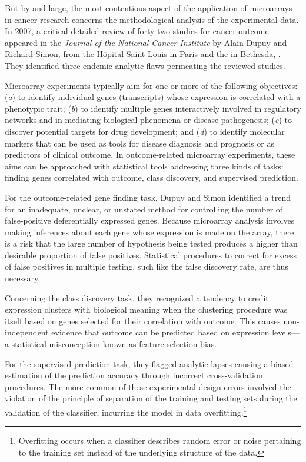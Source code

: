 But by and large, the most contentious aspect of the application of microarrays
in cancer research concerns the methodological analysis of the experimental
data.  In 2007, a critical detailed review of \mbox{forty-two} studies for
cancer outcome appeared in the \emph{Journal of the National Cancer Institute}
by Alain Dupuy and Richard Simon, from the Hôpital Saint-Louis in Paris and the
 in Bethesda, .\cite{dupuy_critical_2007} They
identified three endemic analytic flaws permeating the reviewed studies.

Microarray experiments typically aim for one or more of the following
objectives: (\emph{a}) to identify individual genes (transcripts) whose
expression is correlated with a phenotypic trait; (\emph{b}) to identify
multiple genes interactively involved in regulatory networks and in mediating
biological phenomena or disease pathogenesis; (\emph{c}) to discover potential
targets for drug development; and (\emph{d}) to identify molecular markers that
can be used as tools for disease diagnosis and prognosis or as predictors of
clinical outcome.\cite{kim_expectations_2010} In \mbox{outcome-related}
microarray experiments, these aims can be approached with statistical tools
addressing three kinds of tasks: finding genes correlated with outcome, class
discovery, and supervised prediction.

For the outcome-related gene finding task, Dupuy and Simon identified a trend
for an inadequate, unclear, or unstated method for controlling the number of
\mbox{false-positive} deferentially expressed genes.  Because microarray
analysis involves making inferences about each gene whose expression is made on
the array, there is a risk that the large number of hypothesis being tested
produces a higher than desirable proportion of false positives.  Statistical
procedures to correct for excess of false positives in multiple testing, such
like the false discovery rate, are thus
necessary.\cite{benjamini_controlling_1995,noble_how_2009}

Concerning the class discovery task, they recognized a tendency to credit
expression clusters with biological meaning when the clustering procedure was
itself based on genes selected for their correlation with outcome.  This causes
non-independent evidence that outcome can be predicted based on expression
levels---a statistical misconception known as feature selection
bias.\cite{ambroise_selection_2002}

For the supervised prediction task, they flagged analytic lapses causing a
biased estimation of the prediction accuracy through incorrect cross-validation
procedures.  The more common of these experimental design errors involved the
violation of the principle of separation of the training and testing sets during
the validation of the classifier, incurring the model in data
overfitting.\footnote{Overfitting occurs when a classifier describes random
  error or noise pertaining to the training set instead of the underlying
  structure of the data.}

